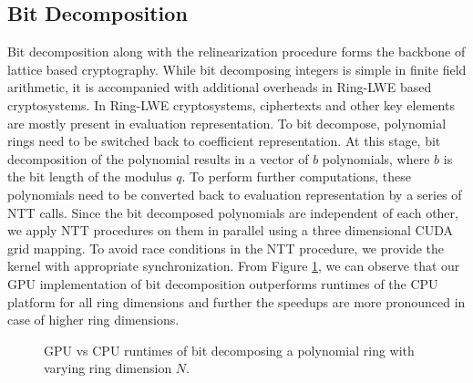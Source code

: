 \subsection{Bit Decomposition} \label{subsec:bit-decomp}

Bit decomposition along with the relinearization procedure forms the backbone of lattice based cryptography. While bit decomposing integers is simple in finite field arithmetic, it is accompanied with additional overheads in Ring-LWE based cryptosystems. In Ring-LWE cryptosystems, ciphertexts and other key elements are mostly present in evaluation representation. To bit decompose, polynomial rings need to be switched back to coefficient representation. At this stage, bit decomposition of the polynomial results in a vector of $b$ polynomials, where $b$ is the bit length of the modulus $q$. To perform further computations, these polynomials need to be converted back to evaluation representation by a series of NTT calls. Since the bit decomposed polynomials are independent of each other, we apply NTT procedures on them in parallel using a three dimensional CUDA grid mapping. To avoid race conditions in the NTT procedure, we provide the kernel with appropriate synchronization.  From Figure \ref{fig:gpuVScpuBitDecomp}, we can observe that our GPU implementation of bit decomposition outperforms runtimes of the CPU platform for all ring dimensions and further the speedups are more pronounced in case of higher ring dimensions. 


\begin{figure}
\centering
{}
\caption{GPU vs CPU runtimes of bit decomposing a polynomial ring with varying ring dimension $N$.}
\label{fig:gpuVScpuBitDecomp}
\end{figure} 



